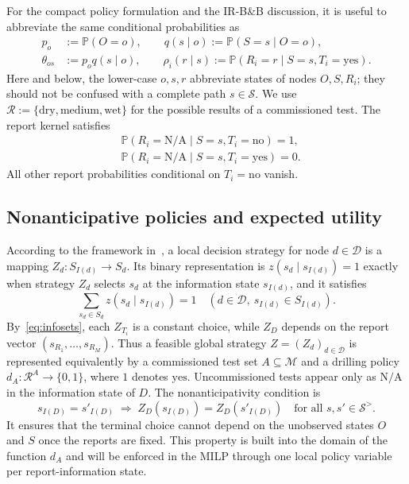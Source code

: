 \documentclass[11pt,a4paper]{article}
\newcommand{\Prob}{\mathbb{P}}
\newcommand{\calM}{\mathcal{M}}
\newcommand{\calR}{\mathcal{R}}
\begin{document}
For the compact policy formulation and the IR-B\&B discussion, it is
useful to abbreviate the same conditional probabilities as
\begin{equation}\label{eq:prior}
\begin{aligned}
 p_o&:=\Prob(O=o),\qquad
 q(s\mid o):=\Prob(S=s\mid O=o),\\
 \theta_{os}&:=p_o q(s\mid o),\qquad
 \rho_i(r\mid s):=\Prob(R_i=r\mid S=s,T_i=\mathrm{yes}).
\end{aligned}
\end{equation}
Here and below, the lower-case $o,s,r$ abbreviate states of nodes
$O,S,R_i$; they should not be confused with a complete path
$s\in\mathcal S$.  We use $\calR:=\{\mathrm{dry},\mathrm{medium},
\mathrm{wet}\}$ for the possible results of a commissioned test.
The report kernel satisfies
\begin{equation}\label{eq:na-kernel}
\begin{aligned}
 &\Prob(R_i=\mathrm{N/A}\mid S=s,T_i=\mathrm{no})=1,\\
 &\Prob(R_i=\mathrm{N/A}\mid S=s,T_i=\mathrm{yes})=0.
\end{aligned}
\end{equation}
All other report probabilities conditional on $T_i=\mathrm{no}$ vanish.

\subsection{Nonanticipative policies and expected utility}\label{sec:policy}
According to the framework in~\cite{Terho2026}, a local decision
strategy for node $d\in\mathcal D$ is a mapping
$Z_d:S_{I(d)}\to S_d$.  Its binary representation is
$z(s_d\mid s_{I(d)})=1$ exactly when strategy $Z_d$ selects
$s_d$ at the information state $s_{I(d)}$, and it satisfies
\begin{equation}\label{eq:localstrategy}
 \sum_{s_d\in S_d}z(s_d\mid s_{I(d)})=1
 \quad(d\in\mathcal D,\ s_{I(d)}\in S_{I(d)}).
\end{equation}
By~\eqref{eq:infosets}, each $Z_{T_i}$ is a constant choice, while
$Z_D$ depends on the report vector $(s_{R_1},\ldots,s_{R_M})$.
Thus a feasible global strategy $Z=(Z_d)_{d\in\mathcal D}$ is
represented equivalently by a commissioned test set
$A\subseteq\calM$ and a drilling policy
$d_A:\calR^A\to\{0,1\}$, where $1$ denotes $\mathrm{yes}$.
Uncommissioned tests appear only as $\mathrm{N/A}$ in the information
state of $D$.  The nonanticipativity condition is
\begin{equation}\label{eq:nonanticipativity}
 s_{I(D)}=s'_{I(D)}\;\Longrightarrow\;
 Z_D(s_{I(D)})=Z_D(s'_{I(D)})
 \quad\text{for all }s,s'\in\mathcal S^>.
\end{equation}
It ensures that the terminal choice cannot depend on the unobserved
states $O$ and $S$ once the reports are fixed.  This property is built
into the domain of the function $d_A$ and will be enforced in the MILP
through one local policy variable per report-information state.
\end{document}
